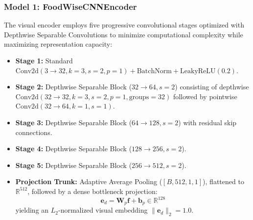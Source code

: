 \documentclass[10pt,journal,compsoc]{IEEEtran}
\begin{document}
\subsubsection{Model 1: FoodWiseCNNEncoder}
The visual encoder employs five progressive convolutional stages optimized with Depthwise Separable Convolutions to minimize computational complexity while maximizing representation capacity:
\begin{itemize}
    \item \textbf{Stage 1:} Standard $\mathrm{Conv2d}(3 \to 32, k=3, s=2, p=1) + \mathrm{BatchNorm} + \mathrm{LeakyReLU}(0.2)$.
    \item \textbf{Stage 2:} Depthwise Separable Block ($32 \to 64, s=2$) consisting of depthwise $\mathrm{Conv2d}(32 \to 32, k=3, s=2, p=1, \mathrm{groups}=32)$ followed by pointwise $\mathrm{Conv2d}(32 \to 64, k=1, s=1)$.
    \item \textbf{Stage 3:} Depthwise Separable Block ($64 \to 128, s=2$) with residual skip connections.
    \item \textbf{Stage 4:} Depthwise Separable Block ($128 \to 256, s=2$).
    \item \textbf{Stage 5:} Depthwise Separable Block ($256 \to 512, s=2$).
    \item \textbf{Projection Trunk:} Adaptive Average Pooling ($[B, 512, 1, 1]$), flattened to $\mathbb{R}^{512}$, followed by a dense bottleneck projection:
    \begin{equation}
        \mathbf{e}_d = \mathbf{W}_p \mathbf{f} + \mathbf{b}_p \in \mathbb{R}^{128}
    \end{equation}
    yielding an $L_2$-normalized visual embedding $\|\mathbf{e}_d\|_2 = 1.0$.
\end{itemize}
\end{document}
